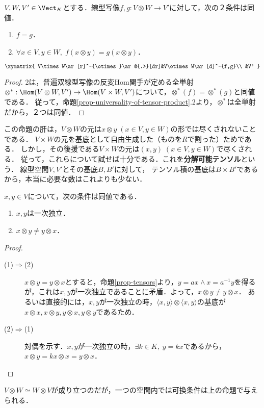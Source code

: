 \documentclass[uplatex, dvipdfmx]{jsreport}
\begin{document}
\begin{proposition}\label{prop-linear-map-from-tensor-product-is-determined-by-basis-destination}
    $V,W,V'\in\Vect_K$とする．線型写像$f,g:V\otimes W\to V'$に対して，次の２条件は同値．
    \begin{enumerate}
        \item $f=g$．
        \item $\forall x\in V,y\in W,\;f(x\otimes y)=g(x\otimes y)$．
    \end{enumerate}
    \[\xymatrix{
        V\times W\ar[r]^-{\otimes}\ar@{.>}[dr]&V\otimes W\ar[d]^-{f,g}\\
        &V'
    }\]
\end{proposition}
\begin{proof}
    2は，普遍双線型写像の反変Hom関手が定める全単射$\otimes^*:\Hom(V\otimes W,V')\to\Hom(V\times W,V')$について，$\otimes^*(f)=\otimes^*(g)$と同値である．
    従って，命題\ref{prop-universality-of-tensor-product}.2より，$\otimes^*$は全単射だから，２つは同値．
\end{proof}
\begin{remarks}[基底と基本テンソルのズレ]
    この命題の肝は，$V\otimes W$の元は$x\otimes y\;(x\in V,y\in W)$の形では尽くされないことである．
    $V\times W$の元を基底として自由生成した（ものを$R$で割った）ためである．
    しかし，その後援である$V\times W$の元は$(x,y)\;(x\in V,y\in W)$で尽くされる．
    従って，これらについて試せば十分である．これを\textbf{分解可能テンソル}という．
    線型空間$V,V'$とその基底$B,B'$に対して，
    テンソル積の基底は$B\times B'$であるから，本当に必要な数はこれよりも少ない．
\end{remarks}

\begin{proposition}[テンソルの非可換条件]
    $x,y\in V$について，次の条件は同値である．
    \begin{enumerate}
        \item $x,y$は一次独立．
        \item $x\otimes y\ne y\otimes x$．
    \end{enumerate}
\end{proposition}
\begin{proof}\mbox{}
    \begin{description}
        \item[(1)$\Rightarrow$(2)] $x\otimes y=y\otimes x$とすると，命題\ref{prop-tensors}より，$y=ax\land x=a^{-1}y$を得るが，これは$x,y$が一次独立であることに矛盾．よって，$x\otimes y\ne y\otimes x$．
        あるいは直接的には，$x,y$が一次独立の時，$\langle x,y\rangle\otimes\langle x,y\rangle$の基底が$x\otimes x,x\otimes y,y\otimes x,y\otimes y$であるため．
        \item[(2)$\Rightarrow$(1)] 対偶を示す．$x,y$が一次独立の時，$\exists k\in K,\; y=kx$であるから，$x\otimes y=kx\otimes x=y\otimes x$．
    \end{description}
\end{proof}
\begin{remarks}
    $V\otimes W\simeq W\otimes V$が成り立つのだが，一つの空間内では可換条件は上の命題で与えられる．
\end{remarks}
\end{document}
